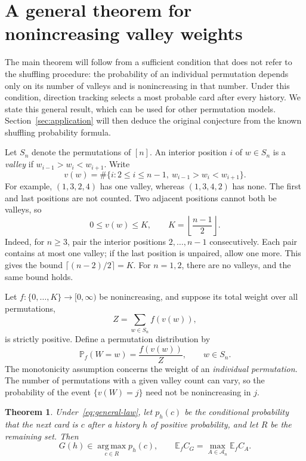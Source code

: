 \documentclass[11pt,reqno]{amsart}
\numberwithin{equation}{section}
\newtheorem{theorem}{Theorem}[section]
\theoremstyle{definition}
\theoremstyle{remark}
\begin{document}
\section{A general theorem for nonincreasing valley weights}\label{sec:valleys}
The main theorem will follow from a sufficient condition that does not refer to the shuffling procedure: the probability of an individual permutation depends only on its number of valleys and is nonincreasing in that number. Under this condition, direction tracking selects a most probable card after every history. We state this general result, which can be used for other permutation models. Section~\ref{sec:application} will then deduce the original conjecture from the known shuffling probability formula.

Let $S_n$ denote the permutations of $[n]$. An interior position $i$ of $w\in S_n$ is a \emph{valley} if $w_{i-1}>w_i<w_{i+1}$. Write
\[
 v(w)=\#\{i:2\le i\le n-1,\ w_{i-1}>w_i<w_{i+1}\}.
\]
For example, $(1,3,2,4)$ has one valley, whereas $(1,3,4,2)$ has none. The first and last positions are not counted. Two adjacent positions cannot both be valleys, so
\[
 0\le v(w)\le K,\qquad K=\left\lfloor\frac{n-1}{2}\right\rfloor.
\]
Indeed, for $n\ge3$, pair the interior positions $2,\ldots,n-1$ consecutively. Each pair contains at most one valley; if the last position is unpaired, allow one more. This gives the bound $\lceil(n-2)/2\rceil=K$. For $n=1,2$, there are no valleys, and the same bound holds.

Let $f:\{0,\ldots,K\}\to[0,\infty)$ be nonincreasing, and suppose its total weight over all permutations,
\[
 Z=\sum_{w\in S_n}f(v(w)),
\]
is strictly positive. Define a permutation distribution by
\begin{equation}\label{eq:general-law}
 \mathbb P_f(W=w)=\frac{f(v(w))}{Z},\qquad w\in S_n.
\end{equation}
The monotonicity assumption concerns the weight of an \emph{individual permutation}. The number of permutations with a given valley count can vary, so the probability of the event $\{v(W)=j\}$ need not be nonincreasing in $j$.

\begin{theorem}\label{thm:general}
Under~\eqref{eq:general-law}, let $p_h(c)$ be the conditional probability that the next card is $c$ after a history $h$ of positive probability, and let $R$ be the remaining set. Then
\[
G(h)\in\operatorname*{arg\,max}_{c\in R}p_h(c),
\qquad
\mathbb E_f C_G=\max_{A\in\mathcal A_n}\mathbb E_f C_A.
\]
\end{theorem}
\end{document}
